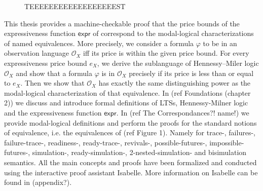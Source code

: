 \begin{isabellebody}
\begin{isamarkuptext}
\begin{figure}[htbp]
\caption{TEEEEEEEEEEEEEEEEEEST}
    \label{fig:your_label}
\end{figure}%
\end{isamarkuptext}\isamarkuptrue%
%
\isadelimdocument
%
\endisadelimdocument
%
\isatagdocument
%
\isamarkuptrue%
%
\endisatagdocument
{\isafolddocument}%
%
\isadelimdocument
%
\endisadelimdocument
%
\begin{isamarkuptext}%
This thesis provides a machine-checkable proof that the price bounds of the expressiveness function $\textsf{expr}$ of \cite{bisping2023process} correspond to the modal-logical characterizations of named equivalences. 
More precisely, we consider a formula $\varphi$ to be in an observation language $\mathcal{O}_X$ iff its price is within the given price bound.
For every expressiveness price bound $e_X$, we derive the sublanguage of Hennessy--Miler logic $\mathcal{O}_X$ and show that a formula $\varphi$ is in $\mathcal{O}_X$ precisely if its price  is less than or equal to $e_X$.
Then we show that $\mathcal{O}_X$ has exactly the same distinguishing power as the modal-logical characterization of that equivalence.
In (ref Foundations (chapter 2)) we discuss and introduce formal definitions of LTSs, Hennessy-Milner logic and the expressiveness function $\textsf{expr}$. In (ref The Correspondances?! name!) we provide modal-logical definitions and perform
the proofs for the standard notions of equivalence, i.e. the equivalences of (ref Figure 1). Namely for trace-, failures-, failure-trace-, readiness-, ready-trace-, revivals-, possible-futures-, impossible-futures-, simulation-, ready-simulation-, 2-nested-simulation- and bisimulation semantics.
All the main concepts and proofs have been formalized and conducted using the interactive proof assistant Isabelle. More information on Isabelle can be found in (appendix?).

\end{isamarkuptext}
\end{isabellebody}
